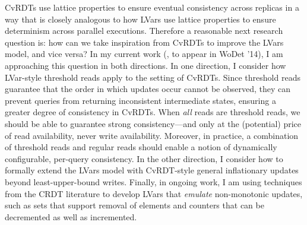 \documentclass{article}
\begin{document}
CvRDTs use lattice properties to ensure eventual consistency across
replicas in a way that is closely analogous to how LVars use lattice
properties to ensure determinism across parallel executions.
Therefore a reasonable next research question is: how can we take
inspiration from CvRDTs to improve the LVars model, and vice versa?
In my current work (\cite{joining-wodet}, to appear in WoDet '14), I
am approaching this question in both directions.  In one direction, I
consider how LVar-style threshold reads apply to the setting of
CvRDTs.  Since threshold reads guarantee that the order in which
updates occur cannot be observed, they can prevent queries from
returning inconsistent intermediate states, ensuring a greater degree
of consistency in CvRDTs.  When \emph{all} reads are threshold reads,
we should be able to guarantee strong consistency---and only at the
(potential) price of read availability, never write
availability. Moreover, in practice, a combination of threshold reads
and regular reads should enable a notion of dynamically configurable,
per-query consistency.  In the other direction, I consider how to
formally extend the LVars model with CvRDT-style general inflationary
updates beyond least-upper-bound writes.  Finally, in ongoing work, I
am using techniques from the CRDT literature \cite{crdts-tr} to
develop LVars that \emph{emulate} non-monotonic updates, such as sets
that support removal of elements and counters that can be decremented
as well as incremented.


\newcommand{\myname}[0]{\textbf{Lindsey Kuper}}

\end{document}
